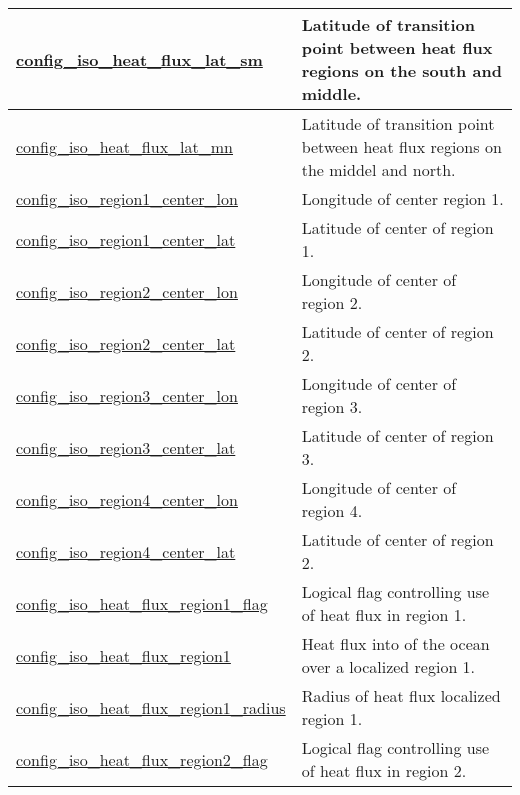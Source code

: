 {\begin{center}
\begin{longtable}{| p{2.0in} || p{4.0in} |}
    \hline
    \hyperref[subsec:nm_sec_config_iso_heat_flux_lat_sm]{config\_iso\_heat\_flux\_lat\_sm} & Latitude of transition point between heat flux regions on the south and middle. \\
    \hline
    \hyperref[subsec:nm_sec_config_iso_heat_flux_lat_mn]{config\_iso\_heat\_flux\_lat\_mn} & Latitude of transition point between heat flux regions on the middel and north. \\
    \hline
    \hyperref[subsec:nm_sec_config_iso_region1_center_lon]{config\_iso\_region1\_center\_lon} & Longitude of center region 1. \\
    \hline
    \hyperref[subsec:nm_sec_config_iso_region1_center_lat]{config\_iso\_region1\_center\_lat} & Latitude of center of region 1. \\
    \hline
    \hyperref[subsec:nm_sec_config_iso_region2_center_lon]{config\_iso\_region2\_center\_lon} & Longitude of center of region 2. \\
    \hline
    \hyperref[subsec:nm_sec_config_iso_region2_center_lat]{config\_iso\_region2\_center\_lat} & Latitude of center of region 2. \\
    \hline
    \hyperref[subsec:nm_sec_config_iso_region3_center_lon]{config\_iso\_region3\_center\_lon} & Longitude of center of region 3. \\
    \hline
    \hyperref[subsec:nm_sec_config_iso_region3_center_lat]{config\_iso\_region3\_center\_lat} & Latitude of center of region 3. \\
    \hline
    \hyperref[subsec:nm_sec_config_iso_region4_center_lon]{config\_iso\_region4\_center\_lon} & Longitude of center of region 4. \\
    \hline
    \hyperref[subsec:nm_sec_config_iso_region4_center_lat]{config\_iso\_region4\_center\_lat} & Latitude of center of region 2. \\
    \hline
    \hyperref[subsec:nm_sec_config_iso_heat_flux_region1_flag]{config\_iso\_heat\_flux\_region1\_\-flag} & Logical flag controlling use of heat flux in region 1. \\
    \hline
    \hyperref[subsec:nm_sec_config_iso_heat_flux_region1]{config\_iso\_heat\_flux\_region1} & Heat flux into of the ocean over a localized region 1. \\
    \hline
    \hyperref[subsec:nm_sec_config_iso_heat_flux_region1_radius]{config\_iso\_heat\_flux\_region1\_\-radius} & Radius of heat flux localized region 1. \\
    \hline
    \hyperref[subsec:nm_sec_config_iso_heat_flux_region2_flag]{config\_iso\_heat\_flux\_region2\_\-flag} & Logical flag controlling use of heat flux in region 2. \\

\end{longtable}
\end{center}}
